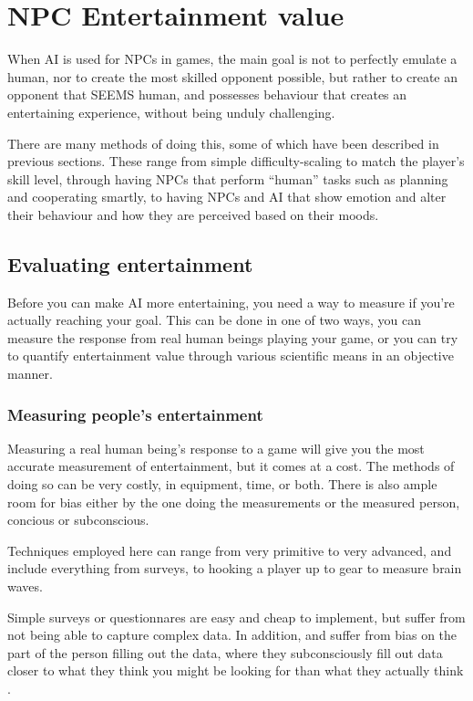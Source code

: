 \documentclass[]{report}
\let\oldmarginpar\marginpar
\renewcommand\marginpar[1]{\-\oldmarginpar[\raggedleft\footnotesize #1]%
{\raggedright\footnotesize #1}}
\begin{document}
\chapter{NPC Entertainment value}
\label{cha:npc-entert-value}

When AI is used for NPCs in games, the main goal is not to perfectly emulate a
human, nor to create the most skilled opponent possible, but rather to create an
opponent that SEEMS human, and possesses behaviour that creates an entertaining
experience, without being unduly challenging.

There are many methods of doing this, some of which have been described in
previous sections\marginpar{Link back?}. These range from simple
difficulty-scaling to match the player's skill level, through having NPCs that
perform ``human'' tasks such as planning and cooperating smartly, to having NPCs
and AI that show emotion and alter their behaviour and how they are perceived
based on their moods.

\section{Evaluating entertainment}
\label{sec:eval-entert}

Before you can make AI more entertaining, you need a way to measure if you're
actually reaching your goal. This can be done in one of two ways, you can
measure the response from real human beings playing your game, or you can try to
quantify entertainment value through various scientific means in an objective
manner.

\subsection{Measuring people's entertainment}
\label{sec:measuring-people}

Measuring a real human being's response to a game will give you the most
accurate measurement of entertainment, but it comes at a cost. The methods of
doing so can be very costly, in equipment, time, or both. There is also ample
room for bias either by the one doing the measurements or the measured person,
concious or subconscious.

Techniques employed here can range from very primitive to very advanced, and
include everything from surveys, to hooking a player up to gear to measure brain
waves.

Simple surveys or questionnares are easy and cheap to implement, but suffer from
not being able to capture complex data. In addition, and suffer from bias on the
part of the person filling out the data, where they subconsciously fill out data
closer to what they think you might be looking for than what they actually think
\citep{mandryk2006using}.
\end{document}
